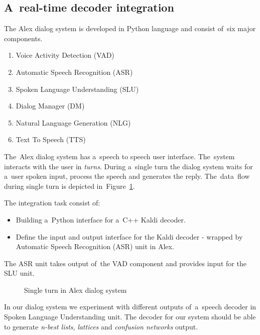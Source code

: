 \subsection{A~real-time decoder integration} 
\label{sub:integration}
The Alex dialog system is developed in Python language and consist of~six major components. 
\begin{enumerate}
    \item Voice Activity Detection (VAD)
    \item Automatic Speech Recognition (ASR) 
    \item Spoken Language Understanding (SLU)
    \item Dialog Manager (DM)
    \item Natural Language Generation (NLG)
    \item Text To Speech (TTS)
\end{enumerate}
The~Alex dialog system has a~speech to speech user interface. The~system interacts with the user in {\it turns}. During a~single turn the dialog system waits for a~user spoken input, process the speech and generates the reply.
The~data~flow during single turn is depicted in~Figure~\ref{fig:dialog_system}.

The integration task consist of:
\begin{itemize}
    \item Building a~Python interface for a~C++ Kaldi decoder.
    \item Define the input and output interface for the Kaldi decoder - wrapped by Automatic Speech Recognition (ASR) unit in Alex.
\end{itemize}
 The ASR unit takes output of~the VAD component and provides input for the SLU unit. 

\begin{figure}
    \begin{center}
    
    \caption{Single turn in Alex dialog system}
    \label{fig:dialog_system} 
    \end{center}
\end{figure}

In our dialog system we experiment with different outputs of~a~speech decoder in Spoken Language Understanding unit. 
The decoder for our system should be able to generate {\it n-best lists}, {\it lattices} and {\it confusion networks} output.

